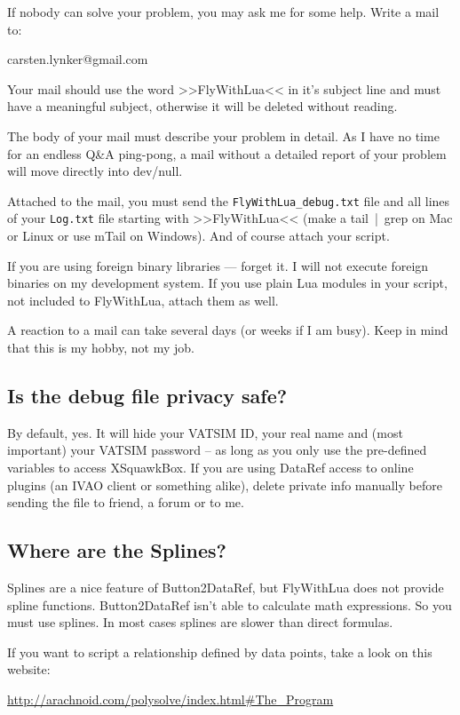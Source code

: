 \documentclass[11pt,parskip=half,a4paper]{scrartcl}
\begin{document}
If nobody can solve your problem, you may ask me for some help. Write a mail to:

carsten.lynker@gmail.com

Your mail should use the word >>FlyWithLua<< in it's subject line and must have a meaningful subject, otherwise it will be deleted without reading.

The body of your mail must describe your problem in detail. As I have no time for an endless Q\&A ping-pong, a mail without a detailed report of your problem will move directly into dev/null.

Attached to the mail, you must send the \verb|FlyWithLua_debug.txt| file and all lines of your \verb|Log.txt| file starting with >>FlyWithLua<< (make a tail~|~grep on Mac or Linux or use mTail on Windows). And of course attach your script.

If you are using foreign binary libraries --- forget it. I will not execute foreign binaries on my development system. If you use plain Lua modules in your script, not included to FlyWithLua, attach them as well.

A reaction to a mail can take several days (or weeks if I am busy). Keep in mind that this is my hobby, not my job.

\subsection{Is the debug file privacy safe?}

By default, yes. It will hide your VATSIM ID, your real name and (most important) your VATSIM password -- as long as you only use the pre-defined variables to access XSquawkBox. If you are using DataRef access to online plugins (an IVAO client or something alike), delete private info manually before sending the file to friend, a forum or to me.

\subsection{Where are the Splines?}

Splines are a nice feature of Button2DataRef, but FlyWithLua does not provide spline functions. Button2DataRef isn't able to calculate math expressions. So you must use splines. In most cases splines are slower than direct formulas.

If you want to script a relationship defined by data points, take a look on this website:

\url{http://arachnoid.com/polysolve/index.html#The_Program}
\end{document}
